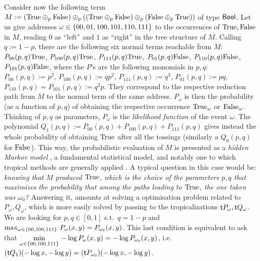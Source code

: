 \documentclass[submission,%
]{eptcs}
\begin{document}
Consider now the following term
$
 M:=(\mathrm{True} \oplus_p\mathrm{False})\oplus_p((\mathrm{True}\oplus_p\mathrm{False})\oplus_p(\mathrm{False}\oplus_p\mathrm{True}))
$
of type $\mathsf{Bool}$.
Let us give addresses $\omega\in\{00,01,100,101,110,111\}$ to the occurrences of $\mathrm{True},\mathrm{False}$ in $M$, reading $0$ as ``left'' and $1$ as ``right'' in the tree structure of $M$.
Calling $q:=1-p$, there are the following six normal terms reachable from $M$:
$P_{00}(p,q)\mathrm{True}$, 
$P_{100}(p,q)\mathrm{True}$, 
$P_{111}(p,q)\mathrm{True}$, 
$P_{01}(p,q)\mathrm{False}$, 
$P_{110}(p,q)\mathrm{False}$,
$P_{101}(p,q)\mathrm{False}$,
where the $P$'s are the following monomials in $p,q$:
$P_{00}(p,q):=p^2$,
$P_{100}(p,q):=qp^2$,
$P_{111}(p,q):=q^3$,
$P_{01}(p,q):=pq$,
$P_{110}(p,q)=P_{101}(p,q):=q^2p$.
They correspond to the respective reduction path from $M$ to the normal term of the same address.
$P_{\omega}$ is then the probability (as a function of $p,q$) of obtaining the respective occurrence $\mathrm{True}_{\omega}$ or $\mathrm{False}_\omega$.%
Thinking of $p,q$ as parameters, $P_{\omega}$ is the \emph{likelihood function} of the event $\omega$.
The polynomial $Q_{1}(p,q):=P_{00}(p,q)+P_{100}(p,q)+P_{111}(p,q)$ gives instead the whole probability of obtaining $\mathrm{True}$ after all the tossings (similarly a $Q_{0}(p,q)$ for $\mathrm{False}$).
This way, the probabilistic evaluation of $M$ is presented as a \emph{hidden Markov model} \cite{Baum1966}, a fundamental statistical model, and notably one to which tropical methods are generally applied \cite{Pachter2004}.
A typical question in this case would be: \emph{knowing that $M$ produced $\mathrm{True}$, which is the choice of the parameters $p,q$ that maximizes the probability that %
among the paths leading to $\mathrm{True}$, the one taken was $\omega_0$?}
Answering it, amounts at solving a optimisation problem related to $P_{\omega}, Q_\omega$, which is more easily solved by 
passing to the tropicalizations $\mathsf{t} P_{\omega},\mathsf{t} Q_{\omega}$. 
We are looking for $p,q\in[0,1]$ s.t.\ $q=1-p$ and
$\max_{\omega\in\{00,100,111\}} \, P_\omega(x,y) = P_{\omega_0}(x,y)$.
This last condition is equivalent to ask that
$\min\limits_{\omega\in\{00,100,111\}} \, -\log P_\omega(x,y) = -\log P_{\omega_0}(x,y)$,
i.e.\
$(\mathsf{t} Q_1)( -\log x, -\log y) = (\mathsf{t} P_{\omega_0})( -\log x, -\log y)$.
\end{document}
